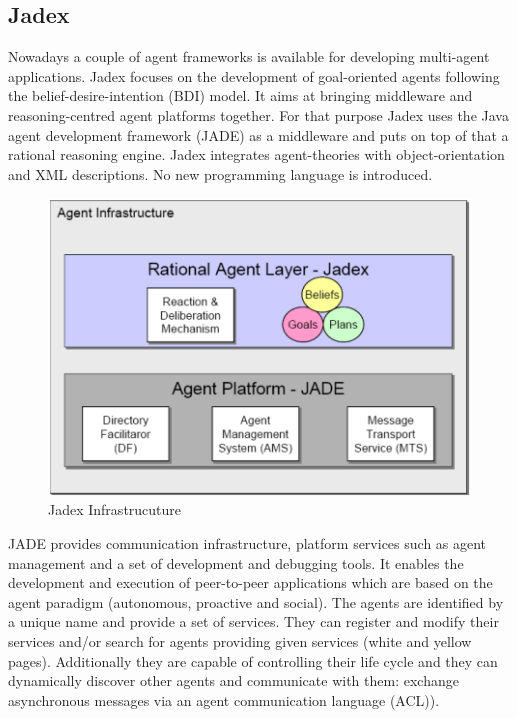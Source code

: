 \subsection{Jadex}
Nowadays a couple of agent frameworks is available for developing multi-agent applications. \cite{Mangina} Jadex focuses on the development of goal-oriented agents following the belief-desire-intention (BDI) model. It aims at bringing middleware and reasoning-centred agent platforms together. For that purpose Jadex uses the Java agent development framework (JADE) as a middleware and puts on top of that a rational reasoning engine. Jadex integrates agent-theories with object-orientation and XML descriptions. No new programming language is introduced. 
\begin{figure}
	\centering
	\includegraphics{images/Jadex_infrastructure.png}
	\caption{Jadex Infrastrucuture}
	\label{fig1}
\end{figure}
JADE provides communication infrastructure, platform services such as agent management and a set of development and debugging tools. It enables the development and execution of  peer-to-peer applications which are based on the agent paradigm (autonomous, proactive and social). The agents are identified by a unique name and provide a set of services. They can register and modify their services and/or search for agents providing given services (white and yellow pages). Additionally they are capable of controlling their life cycle and they can dynamically discover other agents and communicate with them: exchange asynchronous messages via an agent communication language (ACL)). 


